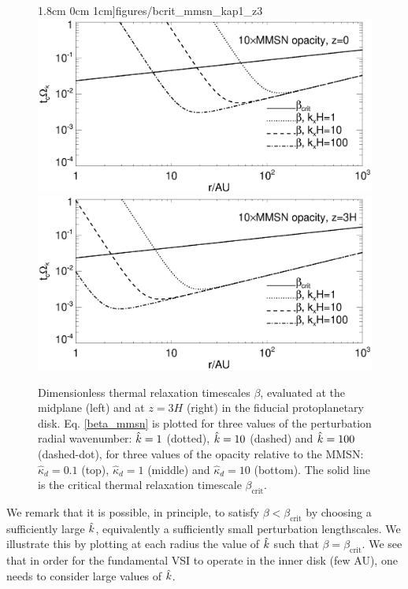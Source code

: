 \begin{figure}
  1.8cm 0cm 1cm]{figures/bcrit_mmsn_kap1_z3}\\
  \includegraphics[scale=.47,clip=true,trim=0cm 0cm 0cm
  1cm]{figures/bcrit_mmsn_kap10_z0}\includegraphics[scale=.47,clip=true,trim=2.5cm 0cm 0cm
  1cm]{figures/bcrit_mmsn_kap10_z3} 
  \caption{Dimensionless thermal relaxation timescales $\beta$,
    evaluated at the midplane (left) and at $z=3H$ (right) in the
    fiducial protoplanetary disk. Eq. \ref{beta_mmsn} is plotted  
    for three values of the 
    perturbation radial wavenumber: $\hat{k}=1$ (dotted), $\hat{k}=10$
    (dashed) and $\hat{k}=100$ (dashed-dot), for three values of the
    opacity relative to the MMSN: $\hat{\kappa}_d=0.1$ (top),
    $\hat{\kappa}_d=1$ (middle) and $\hat{\kappa}_d=10$ (bottom).  
    The solid line is the 
    critical thermal relaxation timescale $\beta_\mathrm{crit}$. 
    \label{mmsn_bcrit_bcool}}   
\end{figure}  



We remark that it is possible, in principle, to satisfy $\beta <
\beta_\mathrm{crit}$ by choosing a sufficiently large $\hat{k}$,
equivalently a sufficiently small perturbation lengthscales. We
illustrate this by plotting at each radius the value of $\hat{k}$ such
that $\beta = \beta_\mathrm{crit}$. We see that in order for the
fundamental VSI to operate in the inner disk (few AU), one needs to
consider large values of $\hat{k}$. 

